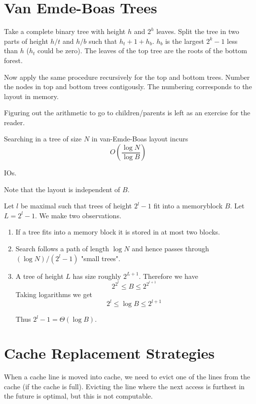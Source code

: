 \section{Van Emde-Boas Trees}

Take a complete binary tree with height $h$ and $2^h$ leaves. Split the tree in two parts of height $h/t$ and $h/b$ such that $h_t +1 + h_b$. $h_b$ is the largest $2^k-1$ less than $h$ ($h_t$ could be zero). The leaves of the top tree are the roots of the bottom forest. 

Now apply the same procedure recursively for the top and bottom trees. Number the nodes in top and bottom trees contigously. The numbering corresponds to the layout in memory.

Figuring out the arithmetic to go to children/parents is left as an exercise for the reader.

\begin{thm} Searching in a tree of size $N$ in van-Emde-Boas layout incurs 
\[O(\frac{\log N}{\log B})\]

IOs.
\end{thm}

Note that the layout is independent of $B$.

\begin{pr} Let $l$ be maximal such that trees of height $2^l-1$ fit into a memoryblock $B$. Let $L=2^l-1$. We make two observations.
\begin{enumerate}
\item If a tree fits into a memory block it is stored in at most two blocks.
\item Search follows a path of length $\log N$ and hence passes through $(\log N)/(2^{l}-1)$ "small trees".
\item A tree of height $L$ has size roughly $2^{L+1}$. Therefore we have
\[2^{2^l} \leq B \leq 2^{2^{l+1}}\]
Taking logarithms we get 
\[2^l \leq \log B \leq 2^{l+1}\]

Thus $2^l-1= \Theta(\log B)$.
\end{enumerate}
\end{pr}

\section{Cache Replacement Strategies}

When a cache line is moved into cache, we need to evict one of the lines from the cache (if the cache is full). Evicting the line where the next access is furthest in the future is optimal, but this is not computable.

